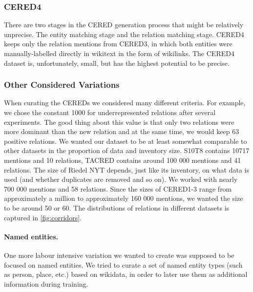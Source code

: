 \subsubsection{CERED4}
There are two stages in the CERED generation process that might be relatively unprecise. The entity matching stage and the relation matching stage. CERED4 keeps only the relation mentions from CERED3, in which both entities were manually-labelled directly in wikitext in the form of wikilinks. The CERED4 dataset is, unfortunately, small, but has the highest potential to be precise.


%


\subsubsection{Other Considered Variations}
\label{sec:otherconsideredvariations}
When curating the CEREDs we considered many different criteria. For example, we chose the constant 1000 for underrepresented relations after several experiments. The good thing about this value is that only two relations were more dominant than the new  relation and at the same time, we would keep 63 positive relations. We wanted our dataset to be at least somewhat comparable to other datasets in the proportion of data and inventory size. S10T8 contains 10717 mentions and 10 relations, TACRED contains around 100 000 mentions and 41 relations. The size of Riedel NYT depends, just like its inventory, on what data is used (and whether duplicates are removed and so on). We worked with nearly 700 000 mentions and 58 relations. Since the sizes of CERED1-3 range from approximately a million to approximately 160 000 mentions, we wanted the size to be around 50 or 60. The distributions of relations in different datasets is captured in \autoref{fig:corridors}.

\paragraph{Named entities.}

One more labour intensive variation we wanted to create was supposed to be focused on named entities. We tried to curate a set of named entity types (such as person, place, etc.) based on wikidata, in order to later use them as additional information during training. 

